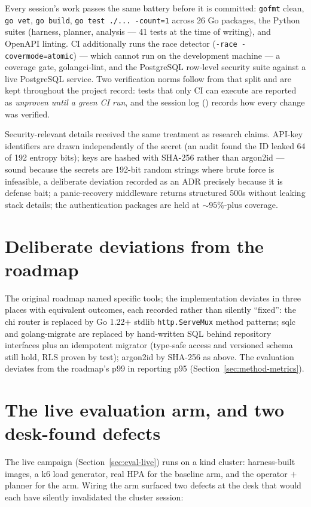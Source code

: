Every session's work passes the same battery before it is committed:
\texttt{gofmt} clean, \texttt{go vet}, \texttt{go build},
\texttt{go test ./...\ -count=1} across 26 Go packages, the Python suites
(harness, planner, analysis --- 41 tests at the time of writing), and
OpenAPI linting. CI additionally runs the race detector
(\texttt{-race -covermode=atomic}) --- which cannot run on the development
machine --- a coverage gate, golangci-lint, and the PostgreSQL row-level
security suite against a live PostgreSQL service. Two verification norms
follow from that split and are kept throughout the project record: tests
that only CI can execute are reported as \emph{unproven until a green CI
run}, and the session log () records how every
change was verified.

Security-relevant details received the same treatment as research claims.
API-key identifiers are drawn independently of the secret (an audit found
the ID leaked 64 of 192 entropy bits); keys are hashed with SHA-256 rather
than argon2id --- sound because the secrets are 192-bit random strings where
brute force is infeasible, a deliberate deviation recorded as an ADR
precisely because it is defense bait; a panic-recovery middleware returns
structured 500s without leaking stack details; the authentication packages
are held at ${\sim}95\%$-plus coverage.

\section{Deliberate deviations from the roadmap}

The original roadmap named specific tools; the implementation deviates in
three places with equivalent outcomes, each recorded rather than silently
``fixed'': the chi router is replaced by Go 1.22$+$ stdlib
\texttt{http.ServeMux} method patterns; sqlc and golang-migrate are replaced
by hand-written SQL behind repository interfaces plus an idempotent
migrator (type-safe access and versioned schema still hold, RLS proven by
test); argon2id by SHA-256 as above. The evaluation deviates from the
roadmap's p99 in reporting p95 (Section~\ref{sec:method-metrics}).

\section{The live evaluation arm, and two desk-found defects}
\label{sec:impl-live}

The live campaign (Section~\ref{sec:eval-live}) runs on a kind cluster:
harness-built images, a k6 load generator, real HPA for the baseline arm,
and the operator $+$ planner for the \jcac{} arm. Wiring the \jcac{} arm
surfaced two defects at the desk that would each have silently invalidated
the cluster session:

